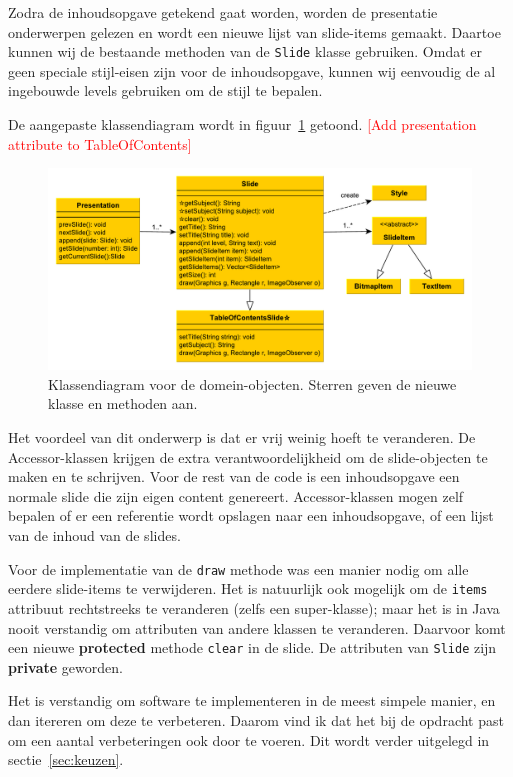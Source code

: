 \documentclass[a4paper]{article}
\newcommand{\todo}[1]{\textcolor{red}{[#1]}\\}
\newcommand{\code}[1]{\lstinline[columns=fixed]{#1}}
\begin{document}
    Zodra de inhoudsopgave getekend gaat worden, worden de presentatie onderwerpen gelezen en wordt een nieuwe lijst van slide-items gemaakt.
    Daartoe kunnen wij de bestaande methoden van de \code{Slide} klasse gebruiken.
    Omdat er geen speciale stijl-eisen zijn voor de inhoudsopgave, kunnen wij eenvoudig de al ingebouwde levels gebruiken om de stijl te bepalen.

    De aangepaste klassendiagram wordt in figuur~\ref{fig:design} getoond.
    \todo{Add presentation attribute to TableOfContents}

    \begin{figure}[!htb]
     \caption{
        Klassendiagram voor de domein-objecten.\label{fig:design}
        Sterren geven de nieuwe klasse en methoden aan.
     }
     \centering \includegraphics[width=\textwidth]{Diagrams/design.pdf}
    \end{figure}

    Het voordeel van dit onderwerp is dat er vrij weinig hoeft te veranderen.
    De Accessor-klassen krijgen de extra verantwoordelijkheid om de slide-objecten te maken en te schrijven.
    Voor de rest van de code is een inhoudsopgave een normale slide die zijn eigen content genereert.
    Accessor-klassen mogen zelf bepalen of er een referentie wordt opslagen naar een inhoudsopgave, of een lijst van de inhoud van de slides.

    Voor de implementatie van de \code{draw} methode was een manier nodig om alle eerdere slide-items te verwijderen.
    Het is natuurlijk ook mogelijk om de \code{items} attribuut rechtstreeks te veranderen (zelfs een super-klasse);
    maar het is in Java nooit verstandig om attributen van andere klassen te veranderen.
    Daarvoor komt een nieuwe \textbf{protected} methode \code{clear} in de slide.
    De attributen van \code{Slide} zijn \textbf{private} geworden.

    Het is verstandig om software te implementeren in de meest simpele manier, en dan itereren om deze te verbeteren.
    Daarom vind ik dat het bij de opdracht past om een aantal verbeteringen ook door te voeren.
    Dit wordt verder uitgelegd in sectie~\ref{sec:keuzen}.
\end{document}
